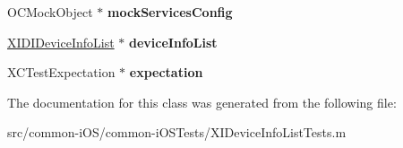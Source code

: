 \begin{DoxyCompactItemize}
O\+C\+Mock\+Object $\ast$ {\bfseries mock\+Services\+Config}
\item 
\hypertarget{interface_x_i_device_info_list_tests_adf98eb4984e1c05dbe8ebfec904d53e8}{}\label{interface_x_i_device_info_list_tests_adf98eb4984e1c05dbe8ebfec904d53e8} 
\hyperlink{interface_x_i_d_i_device_info_list}{X\+I\+D\+I\+Device\+Info\+List} $\ast$ {\bfseries device\+Info\+List}
\item 
\hypertarget{interface_x_i_device_info_list_tests_ab59db7946d84153b3e64cf28ff25d582}{}\label{interface_x_i_device_info_list_tests_ab59db7946d84153b3e64cf28ff25d582} 
X\+C\+Test\+Expectation $\ast$ {\bfseries expectation}
\end{DoxyCompactItemize}


The documentation for this class was generated from the following file\+:\begin{DoxyCompactItemize}
\item 
src/common-\/i\+O\+S/common-\/i\+O\+S\+Tests/X\+I\+Device\+Info\+List\+Tests.\+m\end{DoxyCompactItemize}
